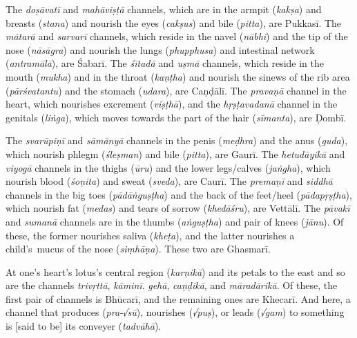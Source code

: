 \documentclass[naipra.tex]{subfiles}
\begin{document}
The \emph{doṣāvatī} and \emph{mahāviṣṭā} channels, which are in the armpit (\emph{kakṣa}) and breasts (\emph{stana}) and nourish the eyes (\emph{cakṣus}) and bile (\emph{pitta}), are Pukkasī.
The \emph{mātarā} and \emph{sarvarī} channels, which reside in the navel (\emph{nābhi}) and the tip of the nose (\emph{nāsāgra}) and nourish the lungs (\emph{phupphusa}) and intestinal network (\emph{antramālā}), are Śabarī.
The \emph{śītadā} and \emph{uṣmā} channels, which reside in the mouth (\emph{mukha}) and in the throat (\emph{kaṇṭha}) and nourish the sinews of the rib area (\emph{pārśvatantu}) and the stomach (\emph{udara}), are Caṇḍālī.
The \emph{pravaṇā} channel in the heart, which nourishes excrement (\emph{viṣṭhā}), and the \emph{hṛṣṭavadanā} channel in the genitals (\emph{liṅga}), which moves towards the part of the hair (\emph{sīmanta}), are Ḍombī.

The \emph{svarūpiṇī} and \emph{sāmānyā} channels in the penis (\emph{meḍhra}) and the anus (\emph{guda}), which nourish phlegm (\emph{śleṣman}) and bile (\emph{pitta}), are Gaurī.
The \emph{hetudāyikā} and \emph{viyogā} channels in the thighs (\emph{ūru}) and the lower legs/calves (\emph{jaṅgha}), which nourish blood (\emph{śoṇita}) and sweat (\emph{sveda}), are Caurī.
The \emph{premaṇī} and \emph{siddhā} channels in the big toes (\emph{pādāṅguṣṭha}) and the back of the feet/heel (\emph{pādapṛṣṭha}), which nourish fat (\emph{medas}) and tears of sorrow (\emph{khedāśru}), are Vettālī.
The \emph{pāvakī} and \emph{sumanā} channels are in the thumbs (\emph{aṅguṣṭha}) and pair of knees (\emph{jānu}).
Of these, the former nourishes saliva (\emph{kheṭa}), and the latter nourishes \crux a child's\crux\ mucus of the nose (\emph{siṃhāṇa}).
These two are Ghasmarī.

At one's heart's lotus's central region (\emph{karṇikā}) and its petals to the east and so are the channels \emph{trivṛttā}, \emph{kāminī}. \emph{gehā}, \emph{caṇḍikā}, and \emph{māradārikā}.
Of these, the first pair of channels is Bhūcarī, and the remaining ones are Khecarī.
And here, a channel that produces (\emph{pra-√sū}), nourishes (\emph{√puṣ}), or leads (\emph{√gam}) to something is [said to be] its conveyer (\emph{tadvāhā}).
\end{document}
